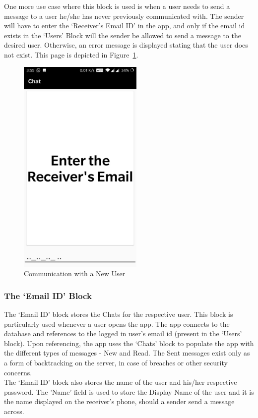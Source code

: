 \documentclass[14pt]{report}
\begin{document}
					One more use case where this block is used is when a user needs to send a message to a user he/she has never previously communicated with. The sender will have to enter the `Receiver's Email ID' in the app, and only if the email id exists in the `Users' Block will the sender be allowed to send a message to the desired user. Otherwise, an error message is displayed stating that the user does not exist. This page is depicted in Figure~\ref{fig:ReceivePage}.
					\begin{figure}[h]
						\includegraphics[width=6cm]{ReceivePage.jpeg}
						\centering
						\caption{Communication with a New User}
						\label{fig:ReceivePage}
					\end{figure} 
				\subsubsection{The `Email ID' Block}
					The `Email ID' block stores the Chats for the respective user. This block is particularly used whenever a user opens the app. The app connects to the database and references to the logged in user's email id (present in the `Users' block). Upon referencing, the app uses the `Chats' block to populate the app with the different types of messages - New and Read. The Sent messages exist only as a form of backtracking on the server, in case of breaches or other security concerns.\\

					The `Email ID' block also stores the name of the user and his/her respective password. The 'Name' field is used to store the Display Name of the user and it is the name displayed on the receiver's phone, should a sender send a message across.
\end{document}
